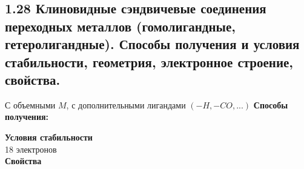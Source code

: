 
\subsection{1.28 Клиновидные сэндвичевые соединения переходных металлов (гомолигандные, гетеролигандные). Способы получения и условия стабильности, геометрия, электронное строение, свойства.}
\begin{figure} [H]
	\centering {\texttt{[image: ss1]}}
\end{figure}
С объемными $M$, с дополнительными лигандами $(-H, -CO, ...)$
\textbf{Способы получения:}\\
\begin{figure} [H]
	\centering {\texttt{[image: ss2]}}
\end{figure}
\textbf{Условия стабильности}\\
18 электронов \\
\textbf{Свойства}\\
\begin{figure} [H]
	\centering {\texttt{[image: ss3]}}
\end{figure}
